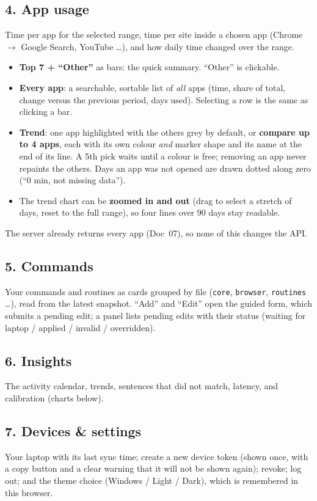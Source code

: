 \documentclass[11pt,a4paper]{article}
\begin{document}
\subsection{4. App usage}
Time per app for the selected range, time per site inside a chosen app (Chrome $\to$ Google Search,
YouTube \ldots), and how daily time changed over the range.
\begin{itemize}[nosep]
  \item \textbf{Top 7 + ``Other''} as bars: the quick summary. ``Other'' is clickable.
  \item \textbf{Every app}: a searchable, sortable list of \emph{all} apps (time, share of total,
        change versus the previous period, days used). Selecting a row is the same as clicking a bar.
  \item \textbf{Trend}: one app highlighted with the others grey by default, or \textbf{compare up
        to 4 apps}, each with its own colour \emph{and} marker shape and its name at the end of its
        line. A 5th pick waits until a colour is free; removing an app never repaints the others.
        Days an app was not opened are drawn dotted along zero (``0 min, not missing data'').
  \item The trend chart can be \textbf{zoomed in and out} (drag to select a stretch of days, reset
        to the full range), so four lines over 90 days stay readable.
\end{itemize}
The server already returns every app (Doc~07), so none of this changes the API.

\subsection{5. Commands}
Your commands and routines as cards grouped by file (\texttt{core}, \texttt{browser},
\texttt{routines} \ldots), read from the latest snapshot. ``Add'' and ``Edit'' open the guided form,
which submits a pending edit; a panel lists pending edits with their status (waiting for laptop /
applied / invalid / overridden).

\subsection{6. Insights}
The activity calendar, trends, sentences that did not match, latency, and calibration (charts
below).

\subsection{7. Devices \& settings}
Your laptop with its last sync time; create a new device token (shown once, with a copy button
and a clear warning that it will not be shown again); revoke; log out; and the theme choice
(Windows / Light / Dark), which is remembered in this browser.
\end{document}
